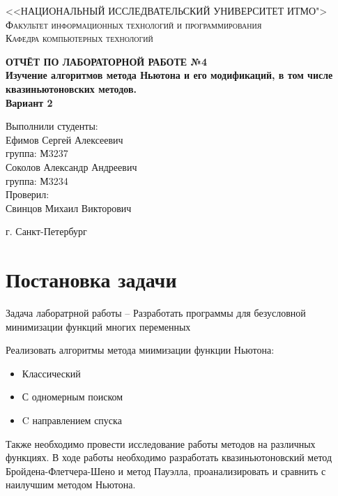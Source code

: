\documentclass[a4paper, 14pt]{article}
\begin{document}
	\renewcommand{\chaptername}{Лабораторная работа}
	\def\contentsname{Содержание}

	\begin{titlepage}
		\begin{center}
			\textsc{<<НАЦИОНАЛЬНЫЙ ИССЛЕДВАТЕЛЬСКИЙ УНИВЕРСИТЕТ ИТМО">\\[5mm]
			Факультет информационных технологий и программирования\\[2mm]
			Кафедра компьютерных технологий}

			\vfill

			\textbf{ОТЧЁТ ПО ЛАБОРАТОРНОЙ РАБОТЕ №4\\[3mm]
			Изучение алгоритмов метода Ньютона и его модификаций, в том числе квазиньютоновских методов.\\
			Вариант 2
\\[28mm]
			}
		\end{center}

		\hfill
		\begin{minipage}{.5\textwidth}
			Выполнили студенты:\\[2mm]
			Ефимов Сергей Алексеевич\\
			группа: М3237\\[2mm]
			Соколов Александр Андреевич\\
			группа: М3234\\[5mm]

			Проверил:\\[2mm]
			Свинцов Михаил Викторович
		\end{minipage}%
		\vfill
		\begin{center}
			г. Санкт-Петербург
		\end{center}
	\end{titlepage}


	\section*{Постановка задачи}
	Задача лаборатрной работы  -- Разработать программы для безусловной минимизации функций многих переменных
	
	Реализовать алгоритмы метода миимизации функции Ньютона:
	\begin{itemize}
		\item Классический
		\item С одномерным поиском
		\item C направлением спуска
	\end{itemize}
	Также необходимо провести исследование работы методов на различных функциях.
	В ходе работы необходимо разработать квазиньютоновский метод Бройдена-Флетчера-Шено и метод Пауэлла, проанализировать и сравнить с наилучшим методом Ньютона. 
	
\end{document}
